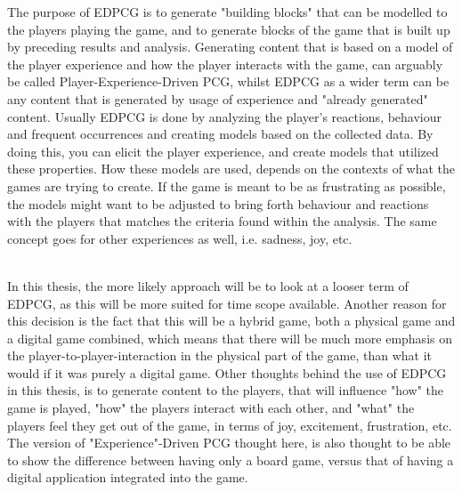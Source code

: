 The purpose of EDPCG is to generate "building blocks" that can be modelled to the players playing the game, and to generate blocks of the game that is built up by preceding results and analysis. Generating content that is based on a model of the player experience and how the player interacts with the game, can arguably be called Player-Experience-Driven PCG, whilst EDPCG as a wider term can be any content that is generated by usage of experience and "already generated" content. Usually EDPCG is done by analyzing the player's reactions, behaviour and frequent occurrences and creating models based on the collected data. By doing this, you can elicit the player experience, and create models that utilized these properties. How these models are used, depends on the contexts of what the games are trying to create. If the game is meant to be as frustrating as possible, the models might want to be adjusted to bring forth behaviour and reactions with the players that matches the criteria found within the analysis. The same concept goes for other experiences as well, i.e. sadness, joy, etc.\\\

In this thesis, the more likely approach will be to look at a looser term of EDPCG, as this will be more suited for time scope available.
Another reason for this decision is the fact that this will be a hybrid game, both a physical game and a digital game combined, which means that there will be much more emphasis on the player-to-player-interaction in the physical part of the game, than what it would if it was purely a digital game. Other thoughts behind the use of EDPCG in this thesis, is to generate content to the players, that will influence "how" the game is played, "how" the players interact with each other, and "what" the players feel they get out of the game, in terms of joy, excitement, frustration, etc. 
The version of "Experience"-Driven PCG thought here, is also thought to be able to show the difference between having only a board game, versus that of having a digital application integrated into the game.

